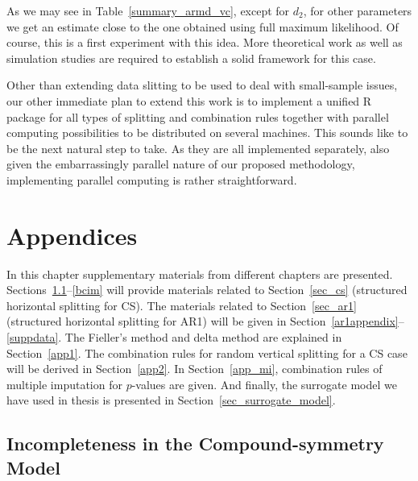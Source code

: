 \documentclass[11pt,a5paper,twoside]{book}
\begin{document}
As we may see in Table~\ref{summary_armd_vc}, except for $d_2$, for other parameters we get an estimate close to the one obtained using full maximum likelihood. Of course, this is a first experiment with this idea. More theoretical work as well as simulation studies are required to establish a solid framework for this case.

Other than extending data slitting to be used to deal with small-sample issues, our other immediate plan to extend this work is to implement a unified R package for all types of splitting and combination rules together with parallel computing possibilities to be distributed on several machines. This sounds like to be the next natural step to take. As they are all implemented separately, also given the embarrassingly parallel nature of our proposed methodology, implementing parallel computing is rather straightforward.
\backmatter

\appendix

\chapter{Appendices}


\setcounter{equation}{0}
\renewcommand{\thesection}{A.\arabic{section}}
\renewcommand{\theequation}{\thesection.\arabic{equation}}
\renewcommand\thefigure{\thesection.\arabic{figure}}    
\renewcommand\thetable{\thesection.\arabic{table}}    

In this chapter supplementary materials from different chapters are presented. Sections~\ref{appA}--\ref{bcim} will provide materials related to Section~\ref{sec_cs} (structured horizontal splitting for CS). The materials related to Section~\ref{sec_ar1} (structured horizontal splitting for AR1) will be given in Section~\ref{ar1appendix}--\ref{suppdata}. The Fieller's method and delta method are explained in Section~\ref{app1}. The combination rules for random vertical splitting for a CS case will be derived in Section~\ref{app2}. In Section~\ref{app_mi}, combination rules of multiple imputation for $p$-values are given. And finally, the surrogate model we have used in thesis is presented in Section~\ref{sec_surrogate_model}.

\section[Incompleteness in the CS Model]{Incompleteness in the Compound-symmetry Model} \label{appA}
\end{document}

